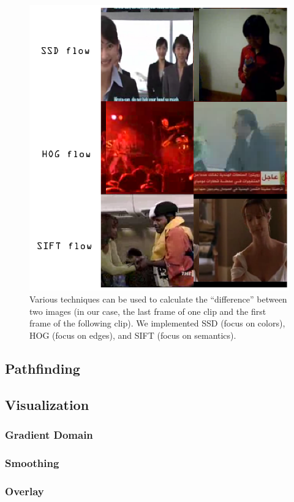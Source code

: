 \begin{figure}
\centering
    \includegraphics[width=1.0\columnwidth]{figures/lowflowstitled.png}
\caption{Various techniques can be used to calculate the ``difference'' between two images (in our case, the last frame of one clip and the first frame of the following clip).  We implemented SSD (focus on colors), HOG (focus on edges), and SIFT (focus on semantics).}
\label{fig:flows}
\end{figure}


\subsection{Pathfinding}

\subsection{Visualization}

\subsubsection{Gradient Domain}

\subsubsection{Smoothing}

\subsubsection{Overlay}
